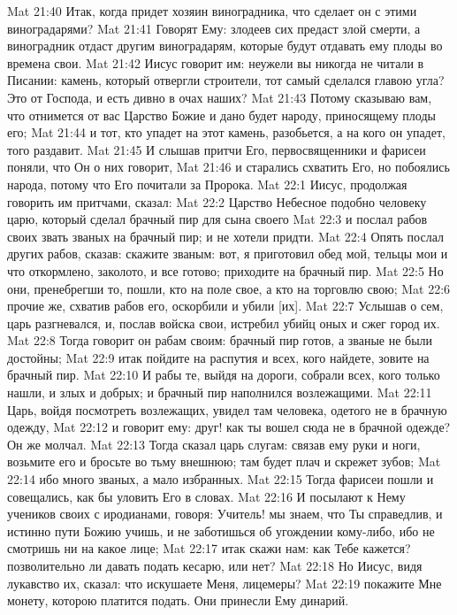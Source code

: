 Mat 21:40  Итак, когда придет хозяин виноградника, что сделает он с этими виноградарями?
Mat 21:41  Говорят Ему: злодеев сих предаст злой смерти, а виноградник отдаст другим виноградарям, которые будут отдавать ему плоды во времена свои.
Mat 21:42  Иисус говорит им: неужели вы никогда не читали в Писании: камень, который отвергли строители, тот самый сделался главою угла? Это от Господа, и есть дивно в очах наших?
Mat 21:43  Потому сказываю вам, что отнимется от вас Царство Божие и дано будет народу, приносящему плоды его;
Mat 21:44  и тот, кто упадет на этот камень, разобьется, а на кого он упадет, того раздавит.
Mat 21:45  И слышав притчи Его, первосвященники и фарисеи поняли, что Он о них говорит,
Mat 21:46  и старались схватить Его, но побоялись народа, потому что Его почитали за Пророка.
Mat 22:1  Иисус, продолжая говорить им притчами, сказал:
Mat 22:2  Царство Небесное подобно человеку царю, который сделал брачный пир для сына своего
Mat 22:3  и послал рабов своих звать званых на брачный пир; и не хотели придти.
Mat 22:4  Опять послал других рабов, сказав: скажите званым: вот, я приготовил обед мой, тельцы мои и что откормлено, заколото, и все готово; приходите на брачный пир.
Mat 22:5  Но они, пренебрегши то, пошли, кто на поле свое, а кто на торговлю свою;
Mat 22:6  прочие же, схватив рабов его, оскорбили и убили [их].
Mat 22:7  Услышав о сем, царь разгневался, и, послав войска свои, истребил убийц оных и сжег город их.
Mat 22:8  Тогда говорит он рабам своим: брачный пир готов, а званые не были достойны;
Mat 22:9  итак пойдите на распутия и всех, кого найдете, зовите на брачный пир.
Mat 22:10  И рабы те, выйдя на дороги, собрали всех, кого только нашли, и злых и добрых; и брачный пир наполнился возлежащими.
Mat 22:11  Царь, войдя посмотреть возлежащих, увидел там человека, одетого не в брачную одежду,
Mat 22:12  и говорит ему: друг! как ты вошел сюда не в брачной одежде? Он же молчал.
Mat 22:13  Тогда сказал царь слугам: связав ему руки и ноги, возьмите его и бросьте во тьму внешнюю; там будет плач и скрежет зубов;
Mat 22:14  ибо много званых, а мало избранных.
Mat 22:15  Тогда фарисеи пошли и совещались, как бы уловить Его в словах.
Mat 22:16  И посылают к Нему учеников своих с иродианами, говоря: Учитель! мы знаем, что Ты справедлив, и истинно пути Божию учишь, и не заботишься об угождении кому-либо, ибо не смотришь ни на какое лице;
Mat 22:17  итак скажи нам: как Тебе кажется? позволительно ли давать подать кесарю, или нет?
Mat 22:18  Но Иисус, видя лукавство их, сказал: что искушаете Меня, лицемеры?
Mat 22:19  покажите Мне монету, которою платится подать. Они принесли Ему динарий.
